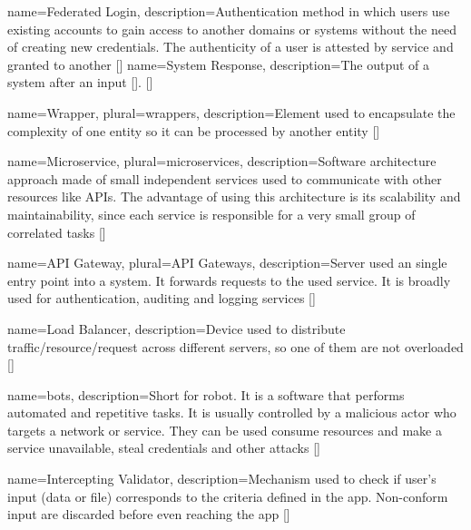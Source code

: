  {
    name={Federated Login},
    description={Authentication method in which users use existing accounts to gain access to another domains or systems
    without the need of creating new credentials. The authenticity of a user is attested by service and granted to another 
    [\cite{refonline:MRFL}]}
}
 {
    name={System Response},
    description={The output of a system after an input [\cite{refonline:HWHE}].
    [\cite{refonline:MRFL}]}
}

 {
    name={Wrapper},
    plural={wrappers},
    description={Element used to encapsulate the complexity of one entity so it can be processed by another entity 
    [\cite{refonline:techwrap}]}
}

 {
    name={Microservice},
    plural={microservices},
    description={Software architecture approach made of small independent services used to communicate with other
    resources like APIs. The advantage of using this architecture is its scalability and maintainability, since 
    each service is responsible for a very small group of correlated tasks [\cite{refonline:awsmicro}]}
}

 {
    name={API Gateway},
    plural={API Gateways},
    description={Server used an single entry point into a system. It forwards requests to the used service. It is 
    broadly used for authentication, auditing and logging services [\cite{refonline:crpag}]}
}

 {
    name={Load Balancer},
    description={Device used to distribute traffic/resource/request across different servers, so one of them
    are not overloaded [\cite{refonline:nglb}]}
}

 {
    name={bots},
    description={Short for robot. It is a software that performs automated and repetitive tasks. It is usually
    controlled by a malicious actor who targets a network or service. They can be used consume resources
    and make a service unavailable, steal credentials and other attacks [\cite{refonline:kpbot}]}
}

 {
    name={Intercepting Validator},
    description={Mechanism used to check if user's input (data or file) corresponds to the criteria defined in
    the app. Non-conform input are discarded before even reaching the app [\cite{refonline:kpbot}]}
}

